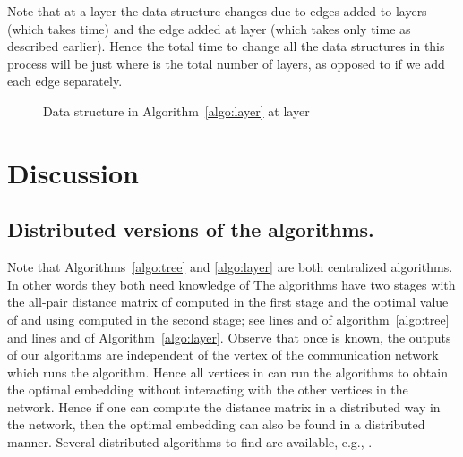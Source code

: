 \documentclass[journal]{IEEEtran}
\begin{document}
Note that at a layer  the data structure changes due to edges added
to layers  (which takes  time) and the edge
added at layer  (which takes only  time as described
earlier). Hence the total time to change all the data structures in
this process will be just  where  is the total number of
layers, as opposed to  if we add each edge separately.
\begin{figure}[tbp]
  \centering
{}
 \caption{Data structure in Algorithm~\ref{algo:layer} at layer }
  \label{fig:algo}
\end{figure}



\section{Discussion}
\label{sec:discuss}

\subsection{Distributed versions of the algorithms.}  

Note that Algorithms~\ref{algo:tree} and \ref{algo:layer} are both
centralized algorithms. In other words they both need knowledge of
 The algorithms have two stages with the all-pair distance
matrix  of  computed in the first stage and the
optimal value of  and  using  computed in the
second stage; see lines  and  of algorithm~\ref{algo:tree} and
lines  and  of Algorithm~\ref{algo:layer}.  Observe that once
 is known, the outputs of our algorithms are independent
of the vertex of the communication network which runs the
algorithm. Hence all vertices in  can run the algorithms to
obtain the optimal embedding without interacting with the other
vertices in the network. Hence if one can compute the distance matrix
in a distributed way in the network, then the optimal embedding can
also be found in a distributed manner. Several distributed algorithms
to find  are available, e.g., \cite{Kanchi04}.
\end{document}

